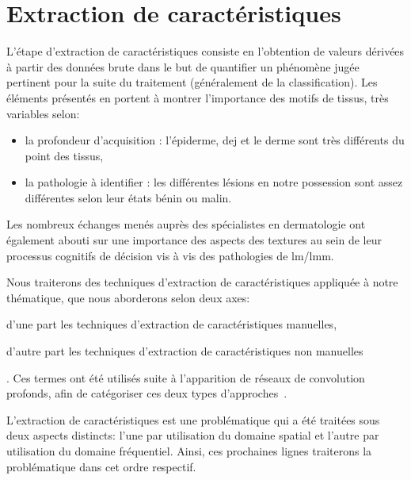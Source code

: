 \section{Extraction de caractéristiques}
\label{chap:feature_extraction}
L'étape d'extraction de caractéristiques consiste en l'obtention de valeurs dérivées à partir des données brute dans le but de quantifier un phénomène jugée pertinent pour la suite du traitement (généralement de la classification). Les éléments présentés en  portent à montrer l'importance des motifs de tissus, très variables selon:
\begin{itemize}
    \item la profondeur d'acquisition : l'épiderme, \gls{dej} et le derme sont très différents du point des tissus,
    \item la pathologie à identifier : les différentes lésions en notre possession sont assez différentes selon leur états bénin ou malin.
\end{itemize}\par

Les nombreux échanges menés auprès des spécialistes en dermatologie ont également abouti sur une importance des aspects des textures au sein de leur processus cognitifs de décision vis à vis des pathologies de \gls{lm}/\gls{lmm}.\par

Nous traiterons des techniques d'extraction de caractéristiques appliquée à notre thématique, que nous aborderons selon deux axes:
\begin{inlinerate}
    \item d'une part les techniques d'extraction de caractéristiques manuelles,
    \item d'autre part les techniques d'extraction de caractéristiques non manuelles
\end{inlinerate}. Ces termes ont été utilisés suite à l'apparition de réseaux de convolution profonds, afin de catégoriser ces deux types d'approches~\cite{Nanni2017}.\par

L'extraction de caractéristiques est une problématique qui a été traitées sous deux aspects distincts: l'une par utilisation du domaine spatial et l'autre par utilisation du domaine fréquentiel. Ainsi, ces prochaines lignes traiterons la problématique dans cet ordre respectif.\par

